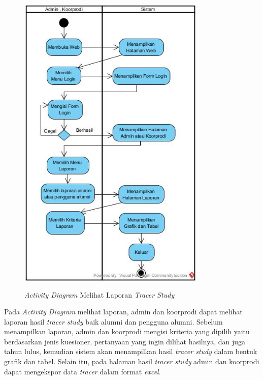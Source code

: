 \begin{figure}[H]
	\centering
	\includegraphics[width=9cm,height=15cm]{gambar/Activitymelihatlaporan}
	\caption{\emph{Activity Diagram} Melihat Laporan \textit{Tracer Study}}
	\label{activity_melihatlaporan}
\end{figure}

Pada \textit{Activity Diagram} melihat laporan, admin dan koorprodi dapat melihat laporan hasil \textit{tracer study} baik alumni dan pengguna alumni. Sebelum menampilkan laporan, admin dan koorprodi mengisi kriteria yang dipilih yaitu berdasarkan jenis kuesioner, pertanyaan yang ingin dilihat hasilnya, dan juga tahun lulus, kemudian sistem akan menampilkan hasil \textit{tracer study} dalam bentuk grafik dan tabel. Selain itu, pada halaman hasil \textit{tracer study} admin dan koorprodi dapat mengekspor data \textit{tracer} dalam format \textit{excel}. 

